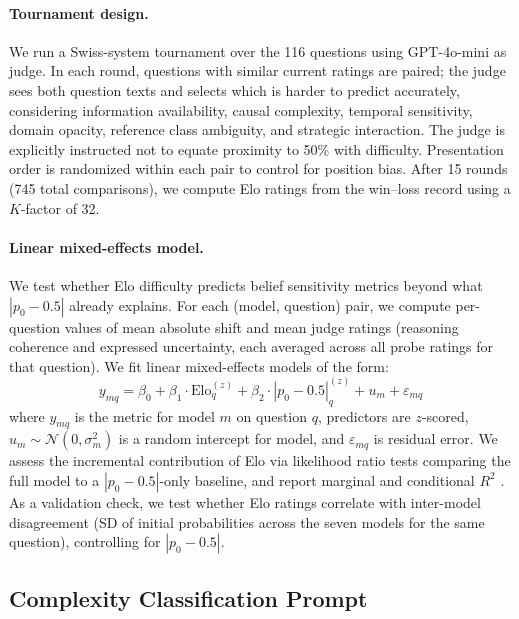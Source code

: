 \documentclass[11pt]{article}
\begin{document}
\paragraph{Tournament design.}
We run a Swiss-system tournament over the 116 questions using GPT-4o-mini as judge.
In each round, questions with similar current ratings are paired; the judge sees both question texts and selects which is harder to predict accurately, considering information availability, causal complexity, temporal sensitivity, domain opacity, reference class ambiguity, and strategic interaction.
The judge is explicitly instructed not to equate proximity to 50\% with difficulty.
Presentation order is randomized within each pair to control for position bias.
After 15 rounds (745 total comparisons), we compute Elo ratings from the win--loss record using a $K$-factor of 32.

\paragraph{Linear mixed-effects model.}
We test whether Elo difficulty predicts belief sensitivity metrics beyond what $|p_0 - 0.5|$ already explains.
For each (model, question) pair, we compute per-question values of mean absolute shift and mean judge ratings (reasoning coherence and expressed uncertainty, each averaged across all probe ratings for that question).
We fit linear mixed-effects models of the form:
\begin{equation}
    y_{mq} = \beta_0 + \beta_1 \cdot \text{Elo}_q^{(z)} + \beta_2 \cdot |p_0 - 0.5|_q^{(z)} + u_m + \varepsilon_{mq}
\end{equation}
where $y_{mq}$ is the metric for model $m$ on question $q$, predictors are $z$-scored, $u_m \sim \mathcal{N}(0, \sigma_m^2)$ is a random intercept for model, and $\varepsilon_{mq}$ is residual error.
We assess the incremental contribution of Elo via likelihood ratio tests comparing the full model to a $|p_0 - 0.5|$-only baseline, and report marginal and conditional $R^2$ \cite{nakagawa2013general}.
As a validation check, we test whether Elo ratings correlate with inter-model disagreement (SD of initial probabilities across the seven models for the same question), controlling for $|p_0 - 0.5|$.

%


\subsection{Complexity Classification Prompt}
\label{app:complexity-prompt}
\end{document}
